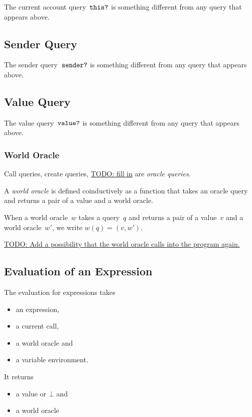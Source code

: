 \documentclass{book}
\newcommand{\todo}[1]{\underline{TODO: {#1}}}
\begin{document}
\newcommand{\thisQuery}[0]{\text{\texttt{this?}}}

The current account query~$\thisQuery$ is something different from any query that appears above.

\subsection{Sender Query}

\newcommand{\senderQuery}{\text{\texttt{sender?}}}

The sender query~$\senderQuery$ is something different from any query that appears above.

\subsection{Value Query}

\newcommand{\valueQuery}{\text{\texttt{value?}}}

The value query~$\valueQuery$ is something different from any query that appears above.

\subsubsection{World Oracle}

Call queries, create queries, \todo{fill in} are \textit{oracle queries}.

A \textit{world oracle} is defined coinductively as a function that takes an oracle query and returns a pair of a value and a world oracle.

When a world oracle~$w$ takes a query~$q$ and returns a pair of a value~$v$ and a world oracle~$w'$, we write $w(q) = (v, w')$.

\todo{Add a possibility that the world oracle calls into the program again.}

\subsection{Evaluation of an Expression}

The evaluation for expressions takes
\begin{itemize}
\item an expression,
\item a current call,
\item a world oracle and
\item a variable environment.
\end{itemize}
It returns
\begin{itemize}
\item a value or $\bot$ and
\item a world oracle
\end{itemize}
\end{document}
